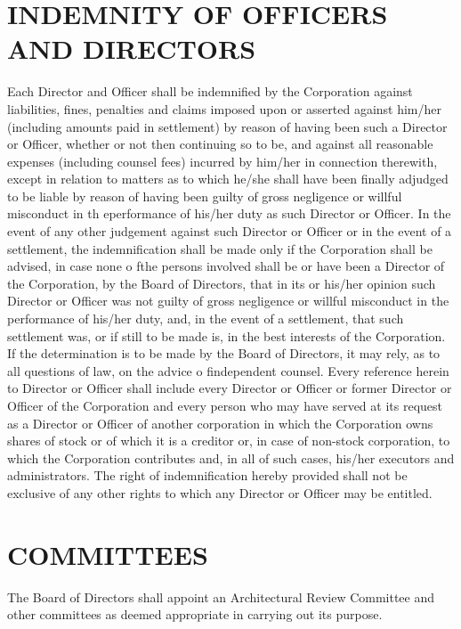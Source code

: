 \documentclass[12pt, letterpaper]{article}
\begin{document}
\section{INDEMNITY OF OFFICERS AND DIRECTORS}
Each Director and Officer shall be indemnified by the Corporation against liabilities, fines, penalties and claims imposed upon or asserted against him/her (including amounts paid in settlement) by reason of having been such a Director or Officer, whether or not then continuing so to be, and against all reasonable expenses (including counsel fees) incurred by him/her in connection therewith, except in relation to matters as to which he/she shall have been finally adjudged to be liable by reason of having been guilty of gross negligence or willful misconduct in th eperformance of his/her duty as such Director or Officer.
In the event of any other judgement against such Director or Officer or in the event of a settlement, the indemnification shall be made only if the Corporation shall be advised, in case none o fthe persons involved shall be or have been a Director of the Corporation, by the Board of Directors, that in its or his/her opinion such Director or Officer was not guilty of gross negligence or willful misconduct in the performance of his/her duty, and, in the event of a settlement, that such settlement was, or if still to be made is, in the best interests of the Corporation.
If the determination is to be made by the Board of Directors, it may rely, as to all questions of law, on the advice o findependent counsel.
Every reference herein to Director or Officer shall include every Director or Officer or former Director or Officer of the Corporation and every person who may have served at its request as a Director or Officer of another corporation in which the Corporation owns shares of stock or of which it is a creditor or, in case of non-stock corporation, to which the Corporation contributes and, in all of such cases, his/her executors and administrators.
The right of indemnification hereby provided shall not be exclusive of any other rights to which any Director or Officer may be entitled.

\section{COMMITTEES}
The Board of Directors shall appoint an Architectural Review Committee and other committees as deemed appropriate in carrying out its purpose.
\end{document}
